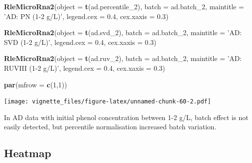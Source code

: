 \documentclass[]{book}
\newenvironment{Shaded}{\begin{snugshade}}{\end{snugshade}}
\newcommand{\KeywordTok}[1]{\textcolor[rgb]{0.13,0.29,0.53}{\textbf{#1}}}
\newcommand{\DataTypeTok}[1]{\textcolor[rgb]{0.13,0.29,0.53}{#1}}
\newcommand{\DecValTok}[1]{\textcolor[rgb]{0.00,0.00,0.81}{#1}}
\newcommand{\FloatTok}[1]{\textcolor[rgb]{0.00,0.00,0.81}{#1}}
\newcommand{\StringTok}[1]{\textcolor[rgb]{0.31,0.60,0.02}{#1}}
\newcommand{\NormalTok}[1]{#1}
\begin{document}
\begin{Shaded}
\begin{Highlighting}[]
\KeywordTok{RleMicroRna2}\NormalTok{(}\DataTypeTok{object =} \KeywordTok{t}\NormalTok{(ad.percentile_}\DecValTok{2}\NormalTok{), }\DataTypeTok{batch =}\NormalTok{ ad.batch_}\DecValTok{2}\NormalTok{, }
             \DataTypeTok{maintitle =} \StringTok{'AD: PN (1-2 g/L)'}\NormalTok{, }\DataTypeTok{legend.cex =} \FloatTok{0.4}\NormalTok{, }
             \DataTypeTok{cex.xaxis =} \FloatTok{0.3}\NormalTok{)}

\KeywordTok{RleMicroRna2}\NormalTok{(}\DataTypeTok{object =} \KeywordTok{t}\NormalTok{(ad.svd_}\DecValTok{2}\NormalTok{), }\DataTypeTok{batch =}\NormalTok{ ad.batch_}\DecValTok{2}\NormalTok{, }
             \DataTypeTok{maintitle =} \StringTok{'AD: SVD (1-2 g/L)'}\NormalTok{, }\DataTypeTok{legend.cex =} \FloatTok{0.4}\NormalTok{, }
             \DataTypeTok{cex.xaxis =} \FloatTok{0.3}\NormalTok{)}

\KeywordTok{RleMicroRna2}\NormalTok{(}\DataTypeTok{object =} \KeywordTok{t}\NormalTok{(ad.ruv_}\DecValTok{2}\NormalTok{), }\DataTypeTok{batch =}\NormalTok{ ad.batch_}\DecValTok{2}\NormalTok{, }
             \DataTypeTok{maintitle =} \StringTok{'AD: RUVIII (1-2 g/L)'}\NormalTok{, }\DataTypeTok{legend.cex =} \FloatTok{0.4}\NormalTok{, }
             \DataTypeTok{cex.xaxis =} \FloatTok{0.3}\NormalTok{)}

\KeywordTok{par}\NormalTok{(}\DataTypeTok{mfrow =} \KeywordTok{c}\NormalTok{(}\DecValTok{1}\NormalTok{,}\DecValTok{1}\NormalTok{))}
\end{Highlighting}
\end{Shaded}

\texttt{[image: vignette\_files/figure-latex/unnamed-chunk-60-2.pdf]}

In AD data with initial phenol concentration between 1-2 g/L, batch
effect is not easily detected, but percentile normalisation increased
batch variation.

\subsection{Heatmap}\label{heatmap-1}
\end{document}
